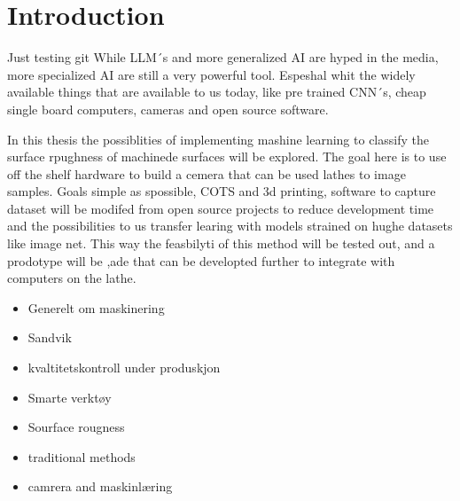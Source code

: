 \chapter{Introduction}
Just testing git
While LLM´s and more generalized AI are hyped in the media, more specialized AI are still a very powerful tool. Espeshal whit the widely available things that are available to us today, like pre trained CNN´s, cheap single board computers, cameras and open source software.

In this thesis the possiblities of implementing mashine learning to classify the surface rpughness of machinede surfaces will be explored. The goal here is to use off the shelf hardware to build a cemera that can be used lathes to image samples. Goals simple as spossible, COTS and 3d printing, software to capture dataset will be modifed from open source projects to reduce development time and the possibilities to us transfer learing with models strained on hughe datasets like image net. This way the feasbilyti of this method will be tested out, and a prodotype will be ,ade that can be developted further to integrate with computers on the lathe.

\begin{itemize}
    \item Generelt om maskinering
    \item Sandvik
    \item kvaltitetskontroll under produskjon
    \item Smarte verktøy
    \item Sourface rougness
    \item traditional methods
    \item camrera and maskinlæring
\end{itemize}
